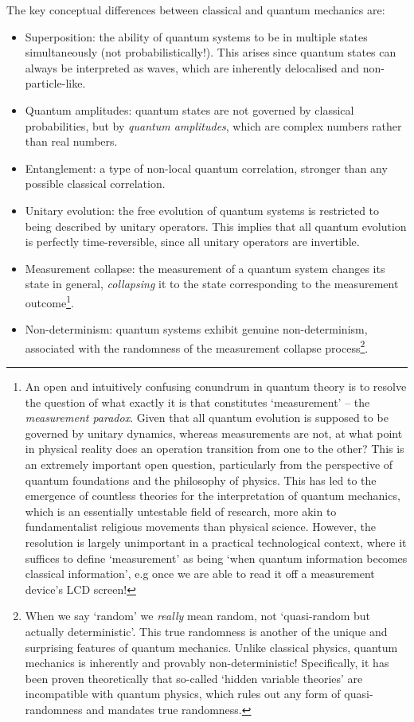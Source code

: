 The key conceptual differences between classical and quantum mechanics are:
\begin{itemize}
	\item Superposition: the ability of quantum systems to be in multiple states simultaneously (not probabilistically!). This arises since quantum states can always be interpreted as waves, which are inherently delocalised and non-particle-like.
	\item Quantum amplitudes: quantum states are not governed by classical probabilities, but by \textit{quantum amplitudes}, which are complex numbers rather than real numbers.
	\item Entanglement: a type of non-local quantum correlation, stronger than any possible classical correlation.
	\item Unitary evolution: the free evolution of quantum systems is restricted to being described by unitary operators. This implies that all quantum evolution is perfectly time-reversible, since all unitary operators are invertible.
	\item Measurement collapse: the measurement of a quantum system changes its state in general, \textit{collapsing} it to the state corresponding to the measurement outcome\footnote{An open and intuitively confusing conundrum in quantum theory is to resolve the question of what exactly it is that constitutes `measurement' -- the \textit{measurement paradox}. Given that all quantum evolution is supposed to be governed by unitary dynamics, whereas measurements are not, at what point in physical reality does an operation transition from one to the other? This is an extremely important open question, particularly from the perspective of quantum foundations and the philosophy of physics. This has led to the emergence of countless theories for the interpretation of quantum mechanics, which is an essentially untestable field of research, more akin to fundamentalist religious movements than physical science. However, the resolution is largely unimportant in a practical technological context, where it suffices to define `measurement' as being `when quantum information becomes classical information', e.g once we are able to read it off a measurement device's LCD screen!}.
	\item Non-determinism: quantum systems exhibit genuine non-determinism, associated with the randomness of the measurement collapse process\footnote{When we say `random' we \textit{really} mean random, not `quasi-random but actually deterministic'. This true randomness is another of the unique and surprising features of quantum mechanics. Unlike classical physics, quantum mechanics is inherently and provably non-deterministic! Specifically, it has been proven theoretically \cite{bib:BellNoHiddenVariables} that so-called `hidden variable theories' are incompatible with quantum physics, which rules out any form of quasi-randomness and mandates true randomness.}.

\end{itemize}
